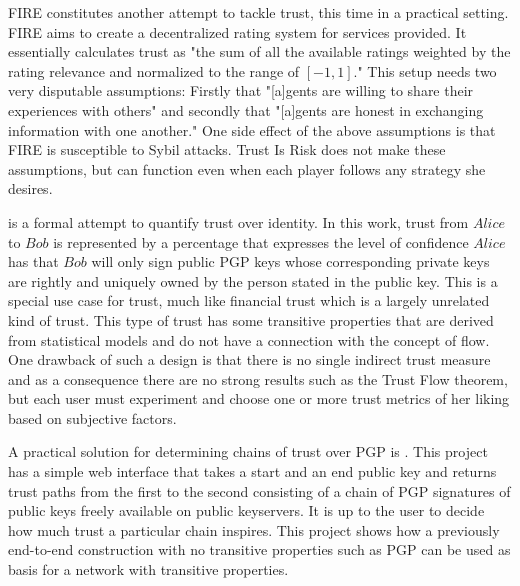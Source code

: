   FIRE \cite{fire} constitutes another attempt to tackle trust, this time in a practical setting. FIRE aims to create a
  decentralized rating system for services provided. It essentially calculates trust as "the sum of all the available ratings
  weighted by the rating relevance and normalized to the range of $\left[-1, 1\right]$." This setup needs two very disputable
  assumptions: Firstly that "[a]gents are willing to share their experiences with others" and secondly that "[a]gents are
  honest in exchanging information with one another." One side effect of the above assumptions is that FIRE is susceptible to
  Sybil attacks. Trust Is Risk does not make these assumptions, but can function even when each player follows any strategy
  she desires.

  \cite{wot} is a formal attempt to quantify trust over identity. In this work, trust from $Alice$ to $Bob$ is represented by
  a percentage that expresses the level of confidence $Alice$ has that $Bob$ will only sign public PGP keys whose
  corresponding private keys are rightly and uniquely owned by the person stated in the public key. This is a special use
  case for trust, much like financial trust which is a largely unrelated kind of trust. This type of trust has some
  transitive properties that are derived from statistical models and do not have a connection with the concept of flow. One
  drawback of such a design is that there is no single indirect trust measure and as a consequence there are no strong
  results such as the Trust Flow theorem, but each user must experiment and choose one or more trust metrics of her liking
  based on subjective factors.

  A practical solution for determining chains of trust over PGP is \cite{pathfinder}. This project has a simple web interface
  that takes a start and an end public key and returns trust paths from the first to the second consisting of a chain of PGP
  signatures of public keys freely available on public keyservers. It is up to the user to decide how much trust a particular
  chain inspires. This project shows how a previously end-to-end construction with no transitive properties such as PGP can
  be used as basis for a network with transitive properties.

